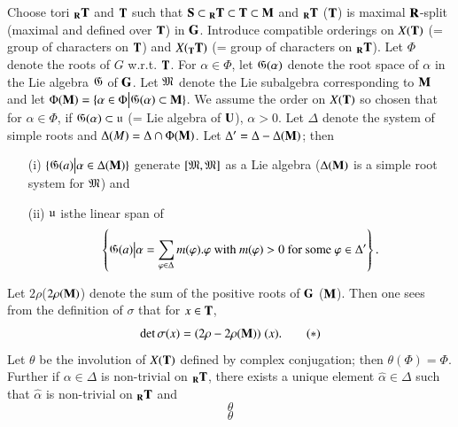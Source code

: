 \section{}%
\begin{notation*}
Choose tori ${}_{\mathbf{R}} \mathbf{T}$ and $\mathbf{T}$ such that $\mathbf{S} \subset {}_{\mathbf{R}} \mathbf{T} \subset \mathbf{T} \subset \mathbf{M}$ and ${}_{\mathbf{R}} \mathbf{T}$ (\resp $\mathbf{T}$) is maximal $\mathbf{R}$-split (\resp maximal and defined over $\mathbf{T}$) in $\mathbf{G}$. Introduce compatible orderings on $X(\mathbf{T})$ (= group of characters on $\mathbf{T}$) and $X ({}_{\mathbf{T}} \mathbf{T})$ (= group of characters on ${}_{\mathbf{R}} \mathbf{T}$). Let $\Phi$ denote the roots of $G$ w.r.t. $\mathbf{T}$. For $\alpha \in \Phi$, let $\mathfrak{G} (\alpha)$ denote the root space of $\alpha$ in the Lie algebra $\mathfrak{G}$ of $\mathbf{G}$. Let $\mathfrak{M}$ denote the Lie subalgebra corresponding to $\mathbf{M}$ and let $\Phi (\mathbf{M}) = \{\alpha \in \Phi \big| \mathfrak{G} (\alpha) \subset \mathbf{M}\}$. We assume the order on $X (\mathbf{T})$ so chosen that for $\alpha \in \Phi$, if $\mathfrak{G} (\alpha) \subset \mathfrak{u}$ (= Lie algebra of $\mathbf{U}$), $\alpha > 0$. Let $\Delta$ denote the system of simple roots and $\Delta (M) = \Delta \cap \Phi (\mathbf{M})$. Let $\Delta' = \Delta - \Delta (\mathbf{M})$; then 
\begin{itemize}
\item[(i)] $\{\mathfrak{G} (a) \big| \alpha \in \Delta (\mathbf{M})\}$ generate $[\mathfrak{M}, \mathfrak{M}]$ as a Lie algebra ($\Delta (\mathbf{M})$ is a simple root system for $\mathfrak{M}$) and 

\item[(ii)] $\mathfrak{u}$ is\pageoriginale the linear span of
$$
\left\{\mathfrak{G} (a) \big| \alpha = \sum\limits_{\varphi \in \Delta} m(\varphi) . \varphi \text{ with } m (\varphi ) >0 \text{ for some } \varphi \in \Delta'  \right\}.
$$
\end{itemize}
Let $2 \rho $(\resp $2\rho(\mathbf{M})$) denote the sum of the positive roots of $\mathbf{G}$ (\resp $\mathbf{M}$). Then one sees from the definition of $\sigma$ that for $x \in \mathbf{T}$, 
\begin{equation}
\det \sigma (x) = (2 \rho - 2 \rho (\mathbf{M})) \;(x).  \tag*{$(\ast)$}
\end{equation}
Let $\theta$ be the involution of $X (\mathbf{T})$ defined by complex conjugation; then $\theta(\Phi) = \Phi$. Further if $\alpha \in \Delta$ is non-trivial on ${}_{\mathbf{R}} \mathbf{T}$, there exists a unique element $\hat{\alpha} \in \Delta$ such that $\hat{\alpha}$ is non-trivial on ${}_{\mathbf{R}} \mathbf{T}$ and 
\begin{equation}
\theta
\tag*{$(\ast)$}
\end{equation}
\begin{equation}
\theta
\tag*{$(\ast)$}
\end{equation}
\end{notation*}





\begin{thebibliography}{99}
\end{thebibliography}

